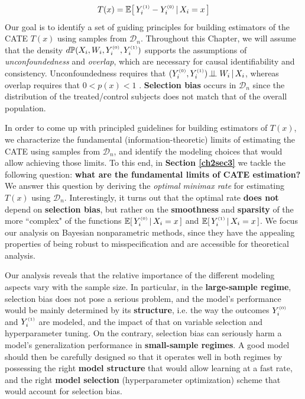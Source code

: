 \documentclass [PhD] {uclathes}
\begin{document}
\begin{align}
T(x) = \mathbb{E}\big[\, Y^{\mbox{\tiny $(1)$}}_i-Y^{\mbox{\tiny $(0)$}}_i\,|\,X_i = x\,\big]
\label{ch2eq2}
\end{align}
Our goal is to identify a set of guiding principles for building estimators of the CATE $T(x)$ using samples from $\mathcal{D}_n$. Throughout this Chapter, we will assume that the density $d\mathbb{P}(X_i,W_i,Y^{\mbox{\tiny $(0)$}}_i,Y^{\mbox{\tiny $(1)$}}_i)$ supports the assumptions of \textit{unconfoundedness} and \textit{overlap}, which are necessary for causal identifiability and consistency. Unconfoundedness requires that  $(Y^{\mbox{\tiny $(0)$}}_i,Y^{\mbox{\tiny $(1)$}}_i) \!\perp\!\!\!\perp W_i\,|\,X_i$, whereas overlap requires that $0 < p(x) < 1$ \cite{rosenbaum1984reducing}. \textbf{Selection bias} occurs in $\mathcal{D}_n$ since the distribution of the treated/control subjects does not match that of the overall population.

In order to come up with principled guidelines for building estimators of $T(x)$, we characterize the fundamental (information-theoretic) limits of estimating the CATE using samples from $\mathcal{D}_n$, and identify the modeling choices that would allow achieving those limits. To this end, in \textbf{Section \ref{ch2sec3}} we tackle the following question: \textbf{what are the fundamental limits of CATE estimation?} We answer this question by deriving the \textit{optimal minimax rate} for estimating $T(x)$ using $\mathcal{D}_n$. Interestingly, it turns out that the optimal rate \textbf{does not} depend on \textbf{selection bias}, but rather on the \textbf{smoothness} and \textbf{sparsity} of the more ``complex" of the functions $\mathbb{E}[\, Y^{\mbox{\tiny $(0)$}}_i\,|\,X_i = x\,]$ and $\mathbb{E}[\, Y^{\mbox{\tiny $(1)$}}_i\,|\,X_i = x\,]$. We focus our analysis on Bayesian nonparametric methods, since they have the appealing properties of being robust to misspecification and are accessible for theoretical analysis. 

Our analysis reveals that the relative importance of the different modeling aspects vary with the sample size. In particular, in the \textbf{large-sample regime}, selection bias does not pose a serious problem, and the model's performance would be mainly determined by its \textbf{structure}, i.e. the way the outcomes $Y^{\mbox{\tiny $(0)$}}_i$ and $Y^{\mbox{\tiny $(1)$}}_i$ are modeled, and the impact of that on variable selection and hyperparameter tuning. On the contrary, selection bias can seriously harm a model's generalization performance in \textbf{small-sample regimes}. A good model should then be carefully designed so that it operates well in both regimes by possessing the right \textbf{model structure} that would allow learning at a fast rate, and the right \textbf{model selection} (hyperparameter optimization) scheme that would account for selection bias. 
   
\end{document}
